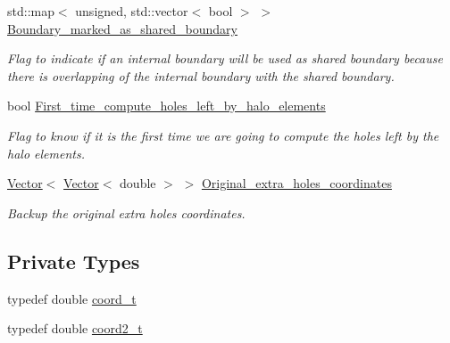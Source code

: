 \begin{DoxyCompactItemize}
std\+::map$<$ unsigned, std\+::vector$<$ bool $>$ $>$ \hyperlink{classoomph_1_1TriangleMesh_acd1571f3189dca349a49a8772cee21d6}{Boundary\+\_\+marked\+\_\+as\+\_\+shared\+\_\+boundary}
\begin{DoxyCompactList}\small\item\em Flag to indicate if an internal boundary will be used as shared boundary because there is overlapping of the internal boundary with the shared boundary. \end{DoxyCompactList}\item 
bool \hyperlink{classoomph_1_1TriangleMesh_ab3953e0939e3fb86a1913faa4698d0b0}{First\+\_\+time\+\_\+compute\+\_\+holes\+\_\+left\+\_\+by\+\_\+halo\+\_\+elements}
\begin{DoxyCompactList}\small\item\em Flag to know if it is the first time we are going to compute the holes left by the halo elements. \end{DoxyCompactList}\item 
\hyperlink{classoomph_1_1Vector}{Vector}$<$ \hyperlink{classoomph_1_1Vector}{Vector}$<$ double $>$ $>$ \hyperlink{classoomph_1_1TriangleMesh_a70bba1b4d0565fa95b1bff6b034a5b7c}{Original\+\_\+extra\+\_\+holes\+\_\+coordinates}
\begin{DoxyCompactList}\small\item\em Backup the original extra holes coordinates. \end{DoxyCompactList}\end{DoxyCompactItemize}
\subsection*{Private Types}
\begin{DoxyCompactItemize}
\item 
typedef double \hyperlink{classoomph_1_1TriangleMesh_ad50b14a66b40a3bfb22a43df86c9006e}{coord\+\_\+t}
\item 
typedef double \hyperlink{classoomph_1_1TriangleMesh_afd4948d805e89116cc5da629e413a449}{coord2\+\_\+t}
\end{DoxyCompactItemize}
